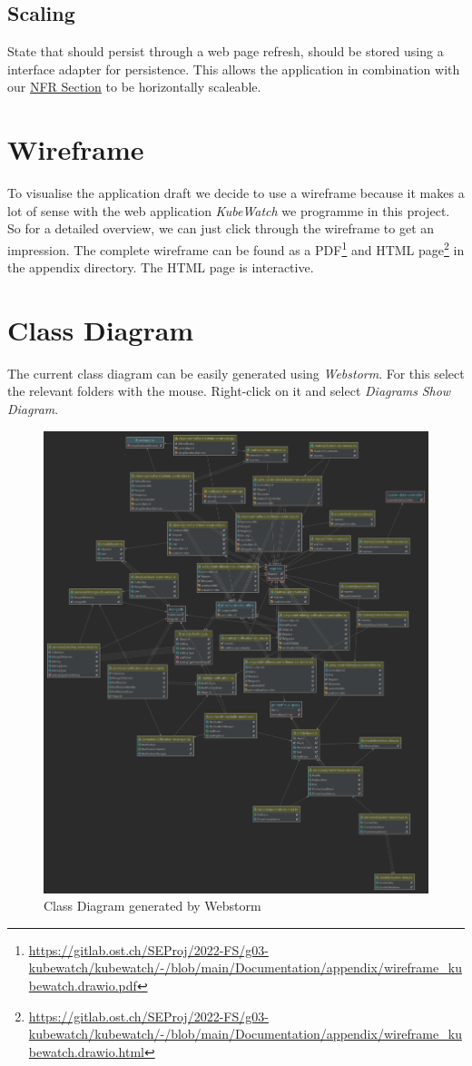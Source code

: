 \subsection{Scaling}

State that should persist through a web page refresh, should be stored using a interface adapter for persistence. This allows the application in combination with our \hyperref[section:non-functional-requirements]{NFR Section} to be horizontally scaleable.

\section{Wireframe}

To visualise the application draft we decide to use a wireframe because it makes a lot of sense with the web application \textit{KubeWatch} we programme in this project. So for a detailed overview, we can just click through the wireframe to get an impression. The complete wireframe can be found as a PDF\footnote{\url{https://gitlab.ost.ch/SEProj/2022-FS/g03-kubewatch/kubewatch/-/blob/main/Documentation/appendix/wireframe_kubewatch.drawio.pdf}} and HTML page\footnote{\url{https://gitlab.ost.ch/SEProj/2022-FS/g03-kubewatch/kubewatch/-/blob/main/Documentation/appendix/wireframe_kubewatch.drawio.html}} in the appendix directory.
The HTML page is interactive.

\section{Class Diagram}
The current class diagram can be easily generated using \textit{Webstorm}.
For this select the relevant folders with the mouse.
Right-click on it and select \textit{Diagrams} \textrightarrow \textit{Show Diagram}.

\begin{figure}[H]
  \centering
  \includegraphics[width=15cm]{resources/class_diagram_from_webstorm}
  \caption{Class Diagram generated by Webstorm}
  \label{fig:class-diagram-generated-by-webstorm}
\end{figure}

